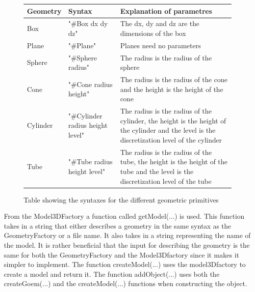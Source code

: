 \begin{figure}[h]
\centering
\begin{tabular}{|l|l|l|}
\hline
Geometry & Syntax                           & Explanation of parametres                                                                                                                    \\ \hline
Box      & "\#Box dx dy dz"                 & The dx, dy and dz are the dimensions of the box                                                                                              \\ \hline
Plane    & "\#Plane"                        & Planes need no parameters                                                                                                                    \\ \hline
Sphere   & "\#Sphere radius"                & The radius is the radius of the sphere                                                                                                       \\ \hline
Cone     & "\#Cone radius height"           & The radius is the radius of the cone and the height is the height of the cone                                                                \\ \hline
Cylinder & "\#Cylinder radius height level" & The radius is the radius of the cylinder, the height is the height of the cylinder and the level is the discretization level of the cylinder \\ \hline
Tube     & "\#Tube radius height level"     & The radius is the radius of the tube, the height is the height of the tube and the level is the discretization level of the tube             \\ \hline
\end{tabular}
\caption{Table showing the syntaxes for the different geometric primitives}
\label{fig:SyntaxTable}
\end{figure}

From the Model3DFactory a function called getModel(...) is used. This function takes in a string that either describes a geometry in the same syntax as the GeometryFactory or a file name. It also takes in a string representing the name of the model. It is rather beneficial that the input for describing the geometry is the same for both the GeometryFactory and the Model3Dfactory since it makes it simpler to implement. The function createModel(...) uses the model3Dfactory to create a model and return it. The function addObject(...) uses both the createGoem(...) and the createModel(...) functions when constructing the object.\\

